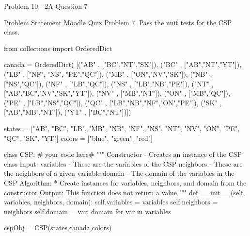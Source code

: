 \begin{problem}{Problem 10 - 2A Question 7}
    \begin{statement}{Problem Statement}
        Moodle Quiz Problem 7. Pass the unit tests for the CSP class.
    \end{statement}

    \begin{highlight}[Solution]
    \begin{code}[Python]
    from collections import OrderedDict

    canada = OrderedDict(
        [("AB"  , ["BC","NT","SK"]),
        ("BC" , ["AB","NT","YT"]),
        ("LB" , ["NF", "NS", "PE","QC"]),
        ("MB" , ["ON","NV","SK"]),
        ("NB" , ["NS","QC"]),
        ("NF" , ["LB","QC"]),
        ("NS" , ["LB","NB","PE"]),
        ("NT" , ["AB","BC","NV","SK","YT"]),
        ("NV" , ["MB","NT"]),
        ("ON" , ["MB","QC"]),
        ("PE" , ["LB","NS","QC"]),
        ("QC" , ["LB","NB","NF","ON","PE"]),  
        ("SK" , ["AB","MB","NT"]),
        ("YT" , ["BC","NT"])])
        
    states = ["AB", "BC", "LB", "MB", "NB", "NF", "NS", "NT", "NV", "ON", "PE", "QC", "SK", "YT"]
    colors = ["blue", "green", "red"]
    
    class CSP:
        # your code here#
        """ Constructor - Creates an instance of the CSP class
            Input:
                variables - These are the variables of the CSP
                neighbors - These are the neighbors of a given variable
                domain - The domain of the variables in the CSP
            Algorithm:
                * Create instances for variables, neighbors, and domain from the constructor
            Output:
                This function does not return a value
        """
        def __init__(self, variables, neighbors, domain):
            self.variables = variables
            self.neighbors = neighbors
            self.domain = {var: domain for var in variables}
    
    cspObj = CSP(states,canada,colors)
    \end{code}
    \end{highlight}
\end{problem}